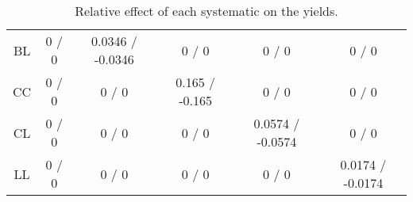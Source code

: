 \documentclass[10pt]{article}
\begin{document}
\begin{table}[htbp]
\begin{center}
\begin{tabular}{|c|c|c|c|c|c|}
 BL & 0 / 0 & 0.0346 / -0.0346 & 0 / 0 & 0 / 0 & 0 / 0 \\ 
 CC & 0 / 0 & 0 / 0 & 0.165 / -0.165 & 0 / 0 & 0 / 0 \\ 
 CL & 0 / 0 & 0 / 0 & 0 / 0 & 0.0574 / -0.0574 & 0 / 0 \\ 
 LL & 0 / 0 & 0 / 0 & 0 / 0 & 0 / 0 & 0.0174 / -0.0174 \\ 
\hline 
\end{tabular} 
\caption{Relative effect of each systematic on the yields.} 
\end{center} 
\end{table} 
\end{document}
